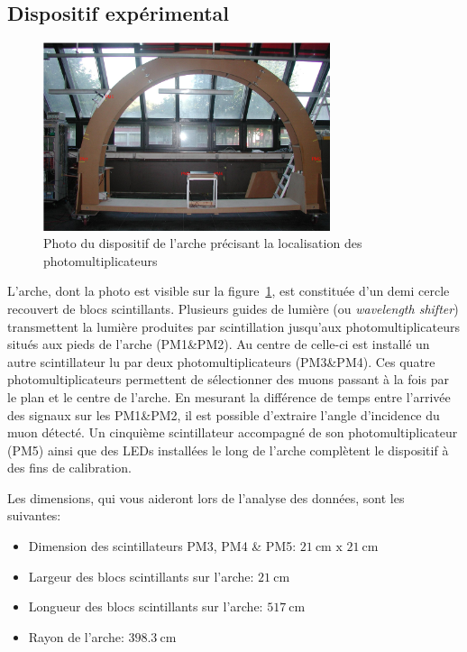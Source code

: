 \subsection{Dispositif expérimental}

\begin{figure}
\begin{center}
    \includegraphics[width=0.75\textwidth]{figures/dispositif_arche.png}
\end{center}
\caption{Photo du dispositif de l'arche précisant la localisation des photomultiplicateurs}
\label{fig:dispositif_arche}
\end{figure}

L'arche, dont la photo est visible sur la figure~\ref{fig:dispositif_arche}, est constituée d'un demi cercle recouvert de blocs scintillants.
Plusieurs guides de lumière (ou \textit{wavelength shifter}) transmettent la lumière produites par scintillation jusqu'aux photomultiplicateurs situés aux pieds de l'arche (PM1\&PM2).
Au centre de celle-ci est installé un autre scintillateur lu par deux photomultiplicateurs (PM3\&PM4).
Ces quatre photomultiplicateurs permettent de sélectionner des muons passant à la fois par le plan et le centre de l'arche.
En mesurant la différence de temps entre l'arrivée des signaux sur les PM1\&PM2, il est possible d'extraire l'angle d'incidence du muon détecté.
Un cinquième scintillateur accompagné de son photomultiplicateur (PM5) ainsi que des LEDs installées le long de l'arche complètent le dispositif à des fins de calibration.

Les dimensions, qui vous aideront lors de l'analyse des données, sont les suivantes:
\begin{itemize}
    \item Dimension des scintillateurs PM3, PM4 \& PM5: \(\SI{21}{\cm}\textrm{ x }\SI{21}{\cm}\)
    \item Largeur des blocs scintillants sur l'arche: \(\SI{21}{\cm}\)
    \item Longueur des blocs scintillants sur l'arche: \(\SI{517}{\cm}\)
    \item Rayon de l'arche: \(\SI{398.3}{\cm}\)
\end{itemize}


